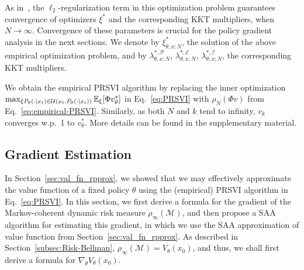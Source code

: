 As in~\citet{meng2006regularized}, the $\ell_2$-regularization term in this optimization problem guarantees convergence of optimizers $\xi^*$ and the corresponding KKT multipliers, when $N\rightarrow\infty$. Convergence of these parameters is crucial for the policy gradient analysis in the next sections. We denote by $\xi^*_{\theta,x;N}$, the solution of the above empirical optimization problem, and by $\lambda^{*,\mathcal P}_{\theta,x;N}$, $\lambda^{*,\mathcal E}_{\theta,x;N}$, $\lambda^{*,\mathcal I}_{\theta,x;N}$, the corresponding KKT multipliers.

We obtain the empirical PRSVI algorithm by replacing the inner optimization $\max_{\xi P_\theta(\cdot |x_t)\in {\mathcal{U}}(x_t,P_\theta(\cdot |x_t))} \mathbb E_{\xi}[\Phi v_\theta^* ]$ in Eq.~\ref{eq:PRSVI} with $\rho_N(\Phi v)$ from Eq.~\ref{eq:empirical-PRSVI}. Similarly, as both $N$ and $k$ tend to infinity, $v_k$ converges w.p.~1 to $v_\theta^*$. More details can be found in the supplementary material.


\subsection{Gradient Estimation}
\label{sec:pol_grad}

In Section~\ref{sec:val_fn_rpprox}, we showed that we may effectively approximate the value function of a fixed policy $\theta$ using the (empirical) PRSVI algorithm in Eq.~\ref{eq:PRSVI}. In this section, we first derive a formula for the gradient of the Markov-coherent dynamic risk measure $\rho_\infty(\mathcal M)$, and then propose a SAA algorithm for estimating this gradient, in which we use the SAA approximation of value function from Section~\ref{sec:val_fn_rpprox}. As described in Section~\ref{subsec:Risk-Bellman}, $\rho_\infty(\mathcal M)=V_\theta(x_0)$, and thus, we shall first derive a formula for $\nabla_\theta V_\theta(x_0)$.

